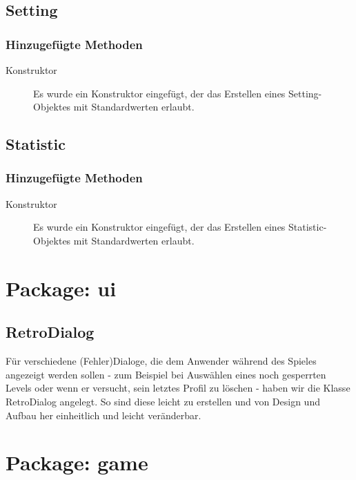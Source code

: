 \documentclass[parskip=full]{scrreprt}
\begin{document}
\subsection{Setting}

\subsubsection{Hinzugefügte Methoden}
\begin{description}
	\item[Konstruktor] Es wurde ein Konstruktor eingefügt, der das Erstellen eines Setting-Objektes mit Standardwerten erlaubt.
	
\end{description}

\subsection{Statistic}

\subsubsection{Hinzugefügte Methoden}
\begin{description}
	\item[Konstruktor] Es wurde ein Konstruktor eingefügt, der das Erstellen eines Statistic-Objektes mit Standardwerten erlaubt.
\end{description}

\section{Package: ui}

\subsection{RetroDialog}

Für verschiedene (Fehler)Dialoge, die dem Anwender während des Spieles angezeigt werden sollen - zum Beispiel bei Auswählen eines noch gesperrten Levels oder wenn er versucht, sein letztes Profil zu löschen - haben wir die Klasse RetroDialog angelegt. So sind diese leicht zu erstellen und von Design und Aufbau her einheitlich und leicht veränderbar.

\section{Package: game}
\end{document}
